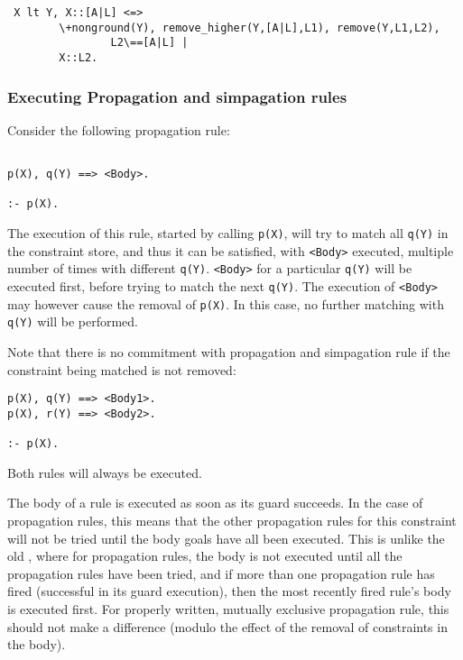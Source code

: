 \begin{verbatim}
 X lt Y, X::[A|L] <=> 
        \+nonground(Y), remove_higher(Y,[A|L],L1), remove(Y,L1,L2),
                L2\==[A|L] |
        X::L2.
\end{verbatim}

\subsubsection{Executing Propagation and simpagation rules}

Consider the following propagation rule:

\begin{verbatim}

p(X), q(Y) ==> <Body>.

:- p(X).
\end{verbatim}

The execution of this rule, started by calling \verb'p(X)', will try to match
all \verb'q(Y)' in the constraint store, and thus it can be satisfied,
with \verb'<Body>' executed,
multiple number of times with different \verb'q(Y)'. \verb'<Body>' for
a particular \verb'q(Y)' will be executed first, before trying to match
the next \verb'q(Y)'. The execution of \verb'<Body>' may however cause the 
removal of \verb'p(X)'. In this case, no further matching with \verb'q(Y)'
will be performed.

Note that there is no commitment with propagation and simpagation rule
if the constraint being matched is not removed:

\begin{verbatim}
p(X), q(Y) ==> <Body1>.
p(X), r(Y) ==> <Body2>.

:- p(X).
\end{verbatim}

Both rules will always be executed.

The body of a rule is executed as soon as its guard succeeds. In the case
of propagation rules, this means that the other propagation rules for this
constraint will not be tried until the body goals have all been executed.
This is
unlike the old \chr, where for propagation rules, the body is not executed
until all the propagation rules have been tried, and if more than one
propagation rule has fired (successful in its guard execution), then the
most recently fired rule's body is executed first. For properly written,
mutually exclusive propagation rule, this should not make a difference
(modulo the effect of the removal of constraints in the body).

